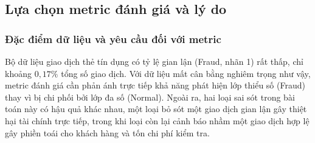 
\subsection{Lựa chọn metric đánh giá và lý do}\label{subsec:metric-danh-gia}

\subsubsection{Đặc điểm dữ liệu và yêu cầu đối với metric}
Bộ dữ liệu giao dịch thẻ tín dụng có tỷ lệ gian lận (Fraud, nhãn 1) rất thấp, chỉ khoảng $0{,}17\%$ tổng số giao dịch. Với dữ liệu mất cân bằng nghiêm trọng như vậy, metric đánh giá cần phản ánh trực tiếp khả năng phát hiện lớp thiểu số (Fraud) thay vì bị chi phối bởi lớp đa số (Normal). Ngoài ra, hai loại sai sót trong bài toán này có hậu quả khác nhau, một loại bỏ sót một giao dịch gian lận gây thiệt hại tài chính trực tiếp, trong khi loại còn lại cảnh báo nhầm một giao dịch hợp lệ gây phiền toái cho khách hàng và tốn chi phí kiểm tra.

